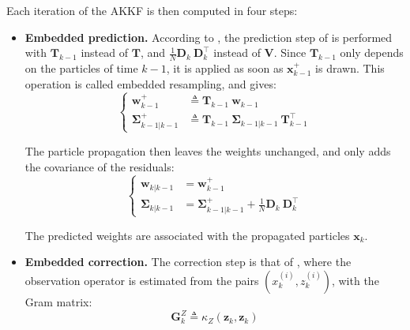 Each iteration of the AKKF is then computed in four steps:
\begin{itemize}
	\item\textbf{Embedded prediction.} According to , the prediction step of  is performed with $\mathbf{T}_{k-1}$ instead of $\mathbf{T}$, and $\frac{1}{N}\mathbf{D}_k\:\mathbf{D}_k^\top$ instead of $\mathbf{V}$. Since $\mathbf{T}_{k-1}$ only depends on the particles of time $k-1$, it is applied as soon as $\mathbf{x}_{k-1}^+$ is drawn. This operation is called embedded resampling, and gives:
	\begin{equation}
		\left\{\begin{aligned}
		\mathbf{w}_{k-1}^+&\triangleq \mathbf{T}_{k-1}\:\mathbf{w}_{k-1}\\
		\boldsymbol{\Sigma}_{k-1|k-1}^+&\triangleq \mathbf{T}_{k-1}\:\boldsymbol{\Sigma}_{k-1|k-1}\:\mathbf{T}_{k-1}^\top
		\end{aligned}\right.
	\end{equation}

	The particle propagation then leaves the weights unchanged, and only adds the covariance of the residuals:
	\begin{equation}
		\left\{\begin{aligned}
		\mathbf{w}_{k|k-1}&=\mathbf{w}_{k-1}^+\\
		\boldsymbol{\Sigma}_{k|k-1}&=\boldsymbol{\Sigma}_{k-1|k-1}^++\frac{1}{N}\mathbf{D}_k\:\mathbf{D}_k^\top
		\end{aligned}\right.
	\end{equation}

	The predicted weights are associated with the propagated particles $\mathbf{x}_k$.
	\item\textbf{Embedded correction.} The correction step is that of , where the observation operator is estimated from the pairs $\left(x_k^{(i)},z_k^{(i)}\right)$, with the Gram matrix:
	\begin{equation}
		\mathbf{G}_k^Z\triangleq \kappa_Z(\mathbf{z}_k,\mathbf{z}_k)
	\end{equation}


\end{itemize}
